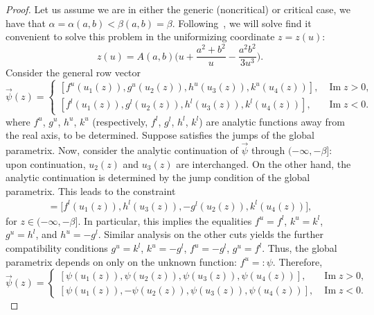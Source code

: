 \documentclass[10pt,a4paper]{amsart}
\numberwithin{equation}{section}
\begin{document}
\begin{proof}
Let us assume we are in either the generic (noncritical) or critical case, we have that $\alpha = \alpha(a,b) < \beta(a,b) = \beta$.
Following~\cite{DK1}, we will solve find it convenient to solve this problem in the uniformizing coordinate $z = z(u)$:
 \begin{equation*}
 z(u) = A(a,b)\biggl(u + \frac{a^2+b^2}{u} - \frac{a^2b^2}{3u^3}\biggr).
 \end{equation*}
Consider the general row vector
 \begin{equation*}
 \vec{\psi}(z) =
 \begin{cases}
 [f^u(u_1(z)), g^u(u_2(z)), h^u(u_3(z)), k^u(u_4(z)) ], & \operatorname{Im} z>0,\\
 [f^l(u_1(z)), g^l(u_2(z)), h^l(u_3(z)), k^l(u_4(z)) ], & \operatorname{Im} z<0.
 \end{cases}
 \end{equation*}
where $f^u$, $g^u$, $h^u$, $k^u$ \big(respectively, $f^l$, $g^l$, $h^l$, $k^l$\big) are analytic functions away from the real axis, to be determined. Suppose  satisfies the jumps of the
global parametrix. Now, consider the analytic continuation of $\vec{\psi}$
through $(-\infty,-\beta]$: upon continuation, $u_2(z)$ and $u_3(z)$ are interchanged. On the other hand, the analytic continuation is determined by the
jump condition of the global parametrix. This leads to the constraint
 \begin{gather*}
 [f^u(u_1(z)), g^u(u_3(z)),h^u(u_2(z)),k^u(u_4(z))]
 = \bigl[f^l(u_1(z)), h^l(u_3(z)),-g^l(u_2(z)),k^l(u_4(z))\bigr],
 \end{gather*}
for $z\in (-\infty,-\beta]$. In particular, this implies the equalities $f^u = f^l$, $k^u=k^l$, $g^u = h^l$, and $h^u = -g^l$. Similar analysis on the other cuts yields the further compatibility conditions
 $g^u = k^l$, $k^u = -g^l$, $f^u = -g^l$, $g^u = f^l$.
Thus, the global parametrix depends on only on the unknown function: $f^u =: \psi$. Therefore,
 \begin{equation*}
 \vec{\psi}(z) =
 \begin{cases}
 [\psi(u_1(z)), \psi(u_2(z)), \psi(u_3(z)), \psi(u_4(z)) ], & \operatorname{Im} z>0,\\
 [\psi(u_1(z)), -\psi(u_2(z)), \psi(u_3(z)), \psi(u_4(z)) ], & \operatorname{Im} z<0.
 \end{cases}
 \end{equation*}


\end{proof}
\end{document}
